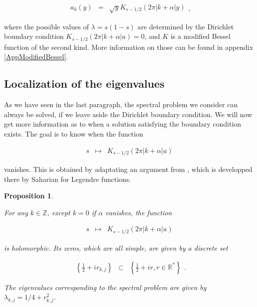 \documentclass{jams-l}
\newtheorem{proposition}[theorem]{Proposition}
\theoremstyle{definition}
\theoremstyle{remark}
\numberwithin{equation}{section}
\begin{document}
        \[ \begin{array}{lll}
                a_k \left( y \right) & = & \sqrt{y} K_{s-1/2} \left( 2 \pi \left \vert k + \alpha \right \vert y \right)
            \end{array} , \]
        
        \noindent where the possible values of $\lambda = s \left( 1 - s \right)$ are determined by the Dirichlet boundary condition $K_{s-1/2} \left( 2 \pi \left \vert k + \alpha \right \vert a \right) = 0$, and $K$ is a modified Bessel function of the second kind. More information on those can be found in appendix \ref{AppModifiedBessel}.
        
    
    \subsection{Localization of the eigenvalues}
    \label{SubSecLocalizationEigenvalues}
    
        As we have seen in the last paragraph, the spectral problem we consider can always be solved, if we leave aside the Dirichlet boundary condition. We will now get more information as to when a solution satisfying the boundary condition exists. The goal is to know when the function
        
        \[ \begin{array}{lll}
                s & \longmapsto & K_{s-1/2} \left( 2 \pi \left \vert k + \alpha \right \vert a \right)
            \end{array} \]
        
        \noindent vanishes. This is obtained by adaptating an argument from \cite[Appendix A]{MR2439244}, which is developped there by Saharian for Legendre functions.
        
        
        \begin{proposition}
        \label{PropZerosModifiedBessel}
        
            For any $k \in \mathbb{Z}$, except $k = 0$ if $\alpha$ vanishes, the function
            
            \[ \begin{array}{lll}
                    s & \longmapsto & K_{s-1/2} \left( 2 \pi \left \vert k + \alpha \right \vert a \right)
                \end{array} \]
            
            \noindent is holomorphic. Its zeros, which are all simple, are given by a discrete set
            
            \[ \begin{array}{lll}
                    \left \{ \frac{1}{2} + i r_{k,j} \right \} & \subset & \left \{ \frac{1}{2} + ir, r \in \mathbb{R}^{\ast} \right \}
                \end{array} . \]
            
            \noindent The eigenvalues corresponding to the spectral problem are given by $\lambda_{k,j} = 1/4 + r_{k,j}^2$.
        
        \end{proposition}
        
\end{document}
